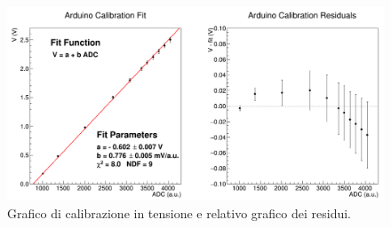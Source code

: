 \documentclass[a4paper,11pt]{article} %
\begin{document}
\begin{figure}[H]
	\centering
	\includegraphics[width=15cm]{../Arduino/Plots/calib_function.png}
	\caption{Grafico di calibrazione in tensione e relativo grafico dei residui.}
	\label{i:ar_calib}
\end{figure}

\noindent 



\end{document}
